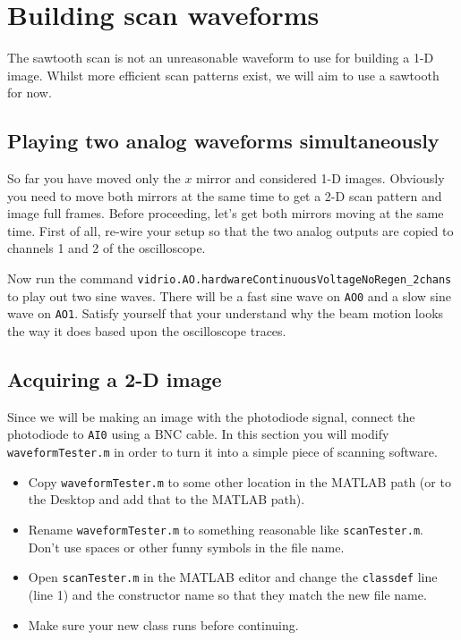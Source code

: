 \documentclass[a4paper]{report}
\begin{document}
\section{Building scan waveforms}
The sawtooth scan is not an unreasonable waveform to use for building a 1-D image. 
Whilst more efficient scan patterns exist, we will aim to use a sawtooth for now.


\subsection{Playing two analog waveforms simultaneously}
So far you have moved only the $x$ mirror and considered 1-D images. 
Obviously you need to move both mirrors at the same time to get a 2-D scan pattern and image full frames.
Before proceeding, let's get both mirrors moving at the same time. 
First of all, re-wire your setup so that the two analog outputs are copied to channels 1 and 2 of the oscilloscope.

\noindent
Now run the command \texttt{vidrio.AO.hardwareContinuousVoltageNoRegen\_2chans} to play out two sine waves.
There will be a fast sine wave on \texttt{AO0} and a slow sine wave on \texttt{AO1}. 
Satisfy yourself that your understand why the beam motion looks the way it does based upon the oscilloscope traces.


\subsection{Acquiring a 2-D image}
Since we will be making an image with the photodiode signal, connect the photodiode to \texttt{AI0} using a BNC cable.
In this section you will modify \texttt{waveformTester.m} in order to turn it into a simple piece of scanning software.

\begin{itemize}
    \setlength\itemsep{0.15em}
    \item Copy \texttt{waveformTester.m} to some other location in the MATLAB path (or to the Desktop and add that to the MATLAB path). 
    \item Rename \texttt{waveformTester.m} to something reasonable like \texttt{scanTester.m}. Don't use spaces or other funny symbols in the file name.
    \item Open \texttt{scanTester.m} in the MATLAB editor and change the \texttt{classdef} line (line 1) and the constructor name so that they match the new file name. 
    \item Make sure your new class runs before continuing.
\end{itemize}
\end{document}
